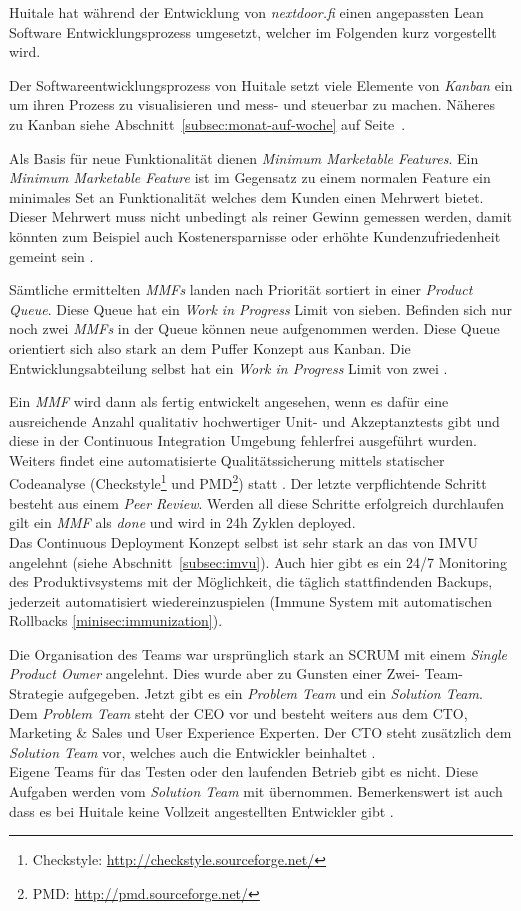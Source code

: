 Huitale hat während der Entwicklung von \emph{nextdoor.fi} einen angepassten
Lean Software Entwicklungsprozess umgesetzt, welcher im Folgenden kurz
vorgestellt wird.

 Der Softwareentwicklungsprozess von Huitale setzt viele
Elemente von \emph{Kanban} ein um ihren Prozess zu visualisieren und mess- und
steuerbar zu machen. Näheres zu Kanban siehe Abschnitt~\ref{subsec:monat-auf-woche}
auf Seite~\pageref{subsec:monat-auf-woche}. 

Als Basis für neue Funktionalität dienen \emph{Minimum Marketable Features}.
Ein \emph{Minimum Marketable Feature} ist im Gegensatz zu einem normalen
Feature ein minimales Set an Funktionalität welches dem Kunden einen Mehrwert
bietet. Dieser Mehrwert muss nicht unbedingt als reiner Gewinn gemessen
werden, damit könnten zum Beispiel auch Kostenersparnisse oder erhöhte
Kundenzufriedenheit gemeint sein \cite{norefyet}.

Sämtliche ermittelten \emph{MMFs} landen nach Priorität sortiert in einer
\emph{Product Queue}. Diese Queue hat ein \emph{Work in
Progress} Limit von sieben. Befinden sich nur noch zwei \emph{MMFs} in der Queue
können neue aufgenommen werden. Diese Queue orientiert sich also stark an
dem Puffer Konzept aus Kanban. Die Entwicklungsabteilung selbst hat ein
\emph{Work in Progress} Limit von zwei \cite{Taipale2010}.

Ein \emph{MMF} wird dann als fertig entwickelt angesehen, wenn es dafür eine
ausreichende Anzahl qualitativ hochwertiger Unit- und Akzeptanztests gibt und
diese in der Continuous Integration Umgebung fehlerfrei ausgeführt wurden.
Weiters findet eine automatisierte Qualitätssicherung mittels statischer
Codeanalyse (Checkstyle\footnote{Checkstyle:
\url{http://checkstyle.sourceforge.net/}} und PMD\footnote{PMD:
\url{http://pmd.sourceforge.net/}}) statt \cite{Taipale2010}. Der letzte
verpflichtende Schritt besteht aus einem \emph{Peer Review}. Werden all diese
Schritte erfolgreich durchlaufen gilt ein \emph{MMF} als \emph{done} und wird
in 24h Zyklen deployed.\\
Das Continuous Deployment Konzept selbst ist sehr stark an das von IMVU
angelehnt (siehe Abschnitt~\ref{subsec:imvu}). Auch hier gibt es ein 24/7
Monitoring des Produktivsystems mit der Möglichkeit, die täglich
stattfindenden Backups, jederzeit automatisiert wiedereinzuspielen (Immune
System mit automatischen Rollbacks \ref{minisec:immunization}).

Die Organisation des Teams war ursprünglich stark an SCRUM mit einem
\emph{Single Product Owner} angelehnt. Dies wurde aber zu Gunsten einer Zwei-
Team-Strategie aufgegeben. Jetzt gibt es ein \emph{Problem Team} und ein
\emph{Solution Team}. Dem \emph{Problem Team} steht der CEO vor und besteht
weiters aus dem CTO, Marketing \& Sales und User Experience Experten. Der CTO
steht zusätzlich dem \emph{Solution Team} vor, welches auch die Entwickler
beinhaltet \cite{Taipale2010}.\\ Eigene Teams für das Testen oder den
laufenden Betrieb gibt es nicht. Diese Aufgaben werden vom \emph{Solution
Team} mit übernommen. Bemerkenswert ist auch dass es bei Huitale keine
Vollzeit angestellten Entwickler gibt \cite{huitale11}.

